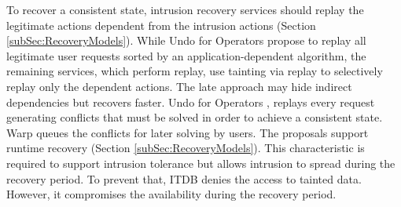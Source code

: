 To recover a consistent state, intrusion recovery services should replay the legitimate actions dependent from the intrusion actions (Section \ref{subSec:RecoveryModels}). While Undo for Operators \cite{undoForOperators} propose to replay all legitimate user requests sorted by an application-dependent algorithm, the remaining services, which perform replay, use tainting via replay to selectively replay only the dependent actions. The late approach may hide indirect dependencies \cite{Xie2008} but recovers faster. Undo for Operators \cite{undoForOperators}, replays every request generating conflicts that must be solved in order to achieve a consistent state. Warp \cite{warp} queues the conflicts for later solving by users. The proposals \cite{itdb,phoenix,warp,aire} support runtime recovery (Section \ref{subSec:RecoveryModels}). This characteristic is required to support intrusion tolerance but allows intrusion to spread during the recovery period. To prevent that, ITDB \cite{itdb} denies the access to tainted data. However, it compromises the availability during the recovery period.\\

